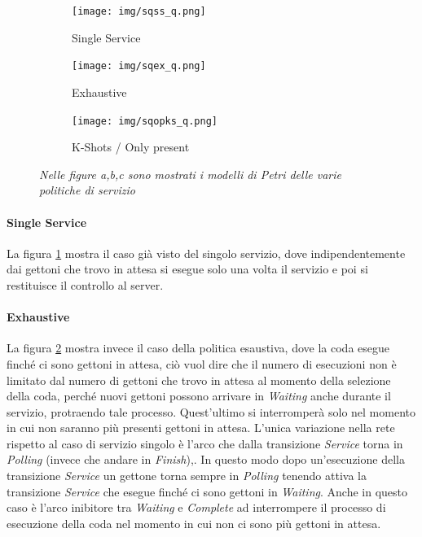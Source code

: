 \documentclass[12pt,a4paper,italian]{article}
\begin{document}
\begin{figure}[!h]
	\begin{subfigure}{.33\textwidth}
		\centering
		\texttt{[image: img/sqss\_q.png]}
		\caption{Single Service}
		\label{fig:sqss_q}
	\end{subfigure}%
	\begin{subfigure}{.33\textwidth}
		\centering
		\texttt{[image: img/sqex\_q.png]}
		\caption{Exhaustive}
		\label{fig:sqex_q}
	\end{subfigure}
	\begin{subfigure}{.33\textwidth}
		\centering
		\texttt{[image: img/sqopks\_q.png]}
		\caption{K-Shots / Only present}
		\label{fig:sqopks_q}
	\end{subfigure}
	\caption{\emph{Nelle figure a,b,c sono mostrati i modelli di Petri delle varie politiche di servizio}}
	\label{fig:queuePolicy}
\end{figure}
\paragraph{Single Service}
La figura \ref{fig:sqss_q} mostra il caso già visto del singolo servizio, dove indipendentemente dai gettoni che trovo in attesa si esegue solo una volta il servizio e poi si restituisce il controllo al server.
\paragraph{Exhaustive} La figura \ref{fig:sqex_q} mostra invece il caso della politica esaustiva, dove la coda esegue finché ci sono gettoni in attesa, ciò vuol dire che il numero di esecuzioni non è limitato dal numero di gettoni che trovo in attesa al momento della selezione della coda, perché nuovi gettoni possono arrivare in \emph{Waiting} anche durante il servizio, protraendo tale processo. Quest'ultimo si interromperà solo nel momento in cui non saranno più presenti gettoni in attesa. L'unica variazione nella rete rispetto al caso di servizio singolo è l'arco che dalla transizione \emph{Service} torna in \emph{Polling} (invece che andare in \emph{Finish}),. In questo modo dopo un'esecuzione della transizione \emph{Service} un gettone torna sempre in \emph{Polling} tenendo attiva la transizione \emph{Service} che esegue finché ci sono gettoni in \emph{Waiting}. Anche in questo caso è l'arco inibitore tra \emph{Waiting} e \emph{Complete} ad interrompere il processo di esecuzione della coda nel momento in cui non ci sono più gettoni in attesa.
\end{document}
